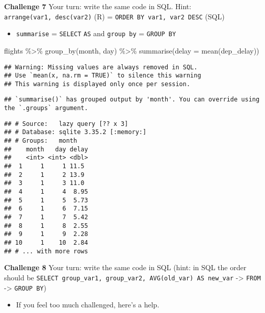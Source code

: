 \documentclass[
]{book}
\newenvironment{Shaded}{\begin{snugshade}}{\end{snugshade}}
\newcommand{\AttributeTok}[1]{\textcolor[rgb]{0.77,0.63,0.00}{#1}}
\newcommand{\FunctionTok}[1]{\textcolor[rgb]{0.00,0.00,0.00}{#1}}
\newcommand{\NormalTok}[1]{#1}
\newcommand{\SpecialCharTok}[1]{\textcolor[rgb]{0.00,0.00,0.00}{#1}}
\providecommand{\tightlist}{%
  \setlength{\itemsep}{0pt}\setlength{\parskip}{0pt}}
\begin{document}
\textbf{Challenge 7}
Your turn: write the same code in SQL.
Hint: \texttt{arrange(var1,\ desc(var2)} (R) = \texttt{ORDER\ BY\ var1,\ var2\ DESC} (SQL)

\begin{itemize}
\tightlist
\item
  \texttt{summarise} = \texttt{SELECT} \texttt{AS} and \texttt{group\ by} = \texttt{GROUP\ BY}
\end{itemize}

\begin{Shaded}
\begin{Highlighting}[]
\NormalTok{flights }\SpecialCharTok{\%\textgreater{}\%}
  \FunctionTok{group\_by}\NormalTok{(month, day) }\SpecialCharTok{\%\textgreater{}\%}
  \FunctionTok{summarise}\NormalTok{(}\AttributeTok{delay =} \FunctionTok{mean}\NormalTok{(dep\_delay)) }
\end{Highlighting}
\end{Shaded}

\begin{verbatim}
## Warning: Missing values are always removed in SQL.
## Use `mean(x, na.rm = TRUE)` to silence this warning
## This warning is displayed only once per session.
\end{verbatim}

\begin{verbatim}
## `summarise()` has grouped output by 'month'. You can override using the `.groups` argument.
\end{verbatim}

\begin{verbatim}
## # Source:   lazy query [?? x 3]
## # Database: sqlite 3.35.2 [:memory:]
## # Groups:   month
##    month   day delay
##    <int> <int> <dbl>
##  1     1     1 11.5 
##  2     1     2 13.9 
##  3     1     3 11.0 
##  4     1     4  8.95
##  5     1     5  5.73
##  6     1     6  7.15
##  7     1     7  5.42
##  8     1     8  2.55
##  9     1     9  2.28
## 10     1    10  2.84
## # ... with more rows
\end{verbatim}

\textbf{Challenge 8}
Your turn: write the same code in SQL (hint: in SQL the order should be \texttt{SELECT\ group\_var1,\ group\_var2,\ AVG(old\_var)\ AS\ new\_var} -\textgreater{} \texttt{FROM} -\textgreater{} \texttt{GROUP\ BY})

\begin{itemize}
\tightlist
\item
  If you feel too much challenged, here's a help.
\end{itemize}
\end{document}
